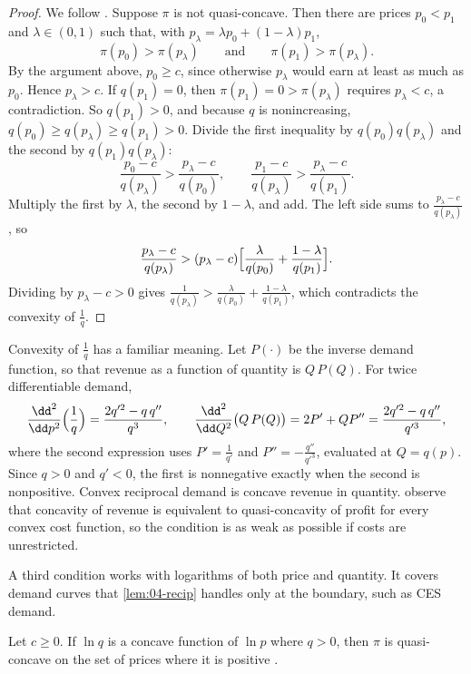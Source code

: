 \begin{proof}
We follow \citet[p.~29]{CaplinNalebuff1991}.
Suppose $\pi$ is not quasi-concave. Then there are prices $p_0 < p_1$ and $\lambda \in (0,1)$ such that, with
$p_\lambda = \lambda p_0 + (1 - \lambda)p_1$,
\[
  \pi(p_0) > \pi(p_\lambda) \qquad\text{and}\qquad \pi(p_1) > \pi(p_\lambda).
\]
By the argument above, $p_0 \ge c$, since otherwise $p_\lambda$ would earn at least as much as $p_0$. Hence
$p_\lambda > c$. If $q(p_1) = 0$, then $\pi(p_1) = 0 > \pi(p_\lambda)$ requires $p_\lambda < c$, a contradiction.
So $q(p_1) > 0$, and because $q$ is nonincreasing, $q(p_0) \ge q(p_\lambda) \ge q(p_1) > 0$. Divide the first
inequality by $q(p_0)q(p_\lambda)$ and the second by $q(p_1)q(p_\lambda)$:
\[
  \frac{p_0 - c}{q(p_\lambda)} > \frac{p_\lambda - c}{q(p_0)}, \qquad \frac{p_1 - c}{q(p_\lambda)} > \frac{p_\lambda - c}{q(p_1)}.
\]
Multiply the first by $\lambda$, the second by $1 - \lambda$, and add. The left side sums to
$\frac{p_\lambda - c}{q(p_\lambda)}$, so
\[
  \frac{p_\lambda - c}{q(p_\lambda)} > (p_\lambda - c)\Bigl[\frac{\lambda}{q(p_0)} + \frac{1 - \lambda}{q(p_1)}\Bigr].
\]
Dividing by $p_\lambda - c > 0$ gives
$\frac{1}{q(p_\lambda)} > \frac{\lambda}{q(p_0)} + \frac{1 - \lambda}{q(p_1)}$, which contradicts the convexity of
$\frac{1}{q}$.
\end{proof}

Convexity of $\frac{1}{q}$ has a familiar meaning. Let $P(\cdot)$ be the inverse demand function, so that
revenue as a function of quantity is $Q\,P(Q)$. For twice differentiable demand,
\[
  \frac{\dd^2}{\dd p^2}\Bigl(\frac{1}{q}\Bigr) = \frac{2q'^2 - q\,q''}{q^3},
  \qquad
  \frac{\dd^2}{\dd Q^2}\bigl(Q\,P(Q)\bigr) = 2P' + QP'' = \frac{2q'^2 - q\,q''}{q'^3},
\]
where the second expression uses $P' = \frac{1}{q'}$ and $P'' = -\frac{q''}{q'^3}$, evaluated at $Q = q(p)$.
Since $q > 0$ and $q' < 0$, the first is nonnegative exactly when the second is nonpositive. Convex reciprocal
demand is concave revenue in quantity. \citet[p.~14 and footnote 11]{CaplinNalebuff1991} observe that concavity of
revenue is equivalent to quasi-concavity of profit for every convex cost function, so the condition is as weak
as possible if costs are unrestricted.

A third condition works with logarithms of both price and quantity. It covers demand curves that
\cref{lem:04-recip} handles only at the boundary, such as CES demand.

\begin{lemma}\label{lem:04-loglog}
Let $c \ge 0$. If $\ln q$ is a concave function of $\ln p$ where $q > 0$, then $\pi$ is quasi-concave on the set
of prices where it is positive \citep[Proposition 11]{CaplinNalebuff1991}.
\end{lemma}

